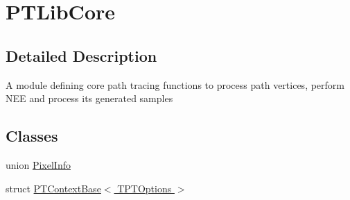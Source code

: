 \hypertarget{group___p_t_lib_core}{}\section{P\+T\+Lib\+Core}
\label{group___p_t_lib_core}


\subsection{Detailed Description}
A module defining core path tracing functions to process path vertices, perform N\+EE and process its generated samples \subsection*{Classes}
\begin{DoxyCompactItemize}
\item 
union \hyperlink{union_pixel_info}{Pixel\+Info}
\item 
struct \hyperlink{struct_p_t_context_base}{P\+T\+Context\+Base$<$ T\+P\+T\+Options $>$}
\end{DoxyCompactItemize}
